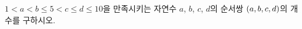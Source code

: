 $1<a<b\le 5<c\le d\le 10$을 만족시키는 자연수 $a$, $b$, $c$, $d$의 순서쌍 $(a{,}\mkern3mu\mathopen{}b{,}\mkern3mu\mathopen{}c{,}\mkern3mu\mathopen{}d)$의 개수를 구하시오.
